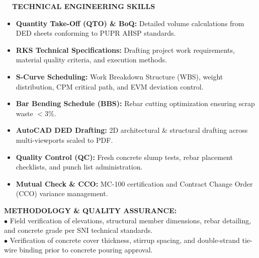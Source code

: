 \documentclass[10pt,a4paper,landscape]{article}
\begin{document}
\noindent
\begin{minipage}[t]{0.32\linewidth}
  \vspace{0pt}
  \begin{tcolorbox}[sharp corners, boxrule=0.8pt, colframe=pborder, colback=white, left=3mm, right=3mm, top=2.5mm, bottom=2.5mm, height=100mm]
    \colorbox{pred}{\fontsize{7pt}{8pt}\selectfont\bfseries\color{white}\ \ TECHNICAL ENGINEERING SKILLS\ \ }\\[1.5mm]

    {\fontsize{6.7pt}{8.4pt}\selectfont\color{psteel}
    \begin{itemize}[leftmargin=3mm, itemsep=0.6mm, topsep=0mm]
      \item \textbf{Quantity Take-Off (QTO) \& BoQ:} Detailed volume calculations from DED sheets conforming to PUPR AHSP standards.
      \item \textbf{RKS Technical Specifications:} Drafting project work requirements, material quality criteria, and execution methods.
      \item \textbf{S-Curve Scheduling:} Work Breakdown Structure (WBS), weight distribution, CPM critical path, and EVM deviation control.
      \item \textbf{Bar Bending Schedule (BBS):} Rebar cutting optimization ensuring scrap waste $< 3\%$.
      \item \textbf{AutoCAD DED Drafting:} 2D architectural \& structural drafting across multi-viewports scaled to PDF.
      \item \textbf{Quality Control (QC):} Fresh concrete slump tests, rebar placement checklists, and punch list administration.
      \item \textbf{Mutual Check \& CCO:} MC-100 certification and Contract Change Order (CCO) variance management.
    \end{itemize}
    }
  \end{tcolorbox}
  \vspace{2mm}

  \begin{tcolorbox}[sharp corners, boxrule=0.6pt, colframe=pnavy, colback=pbglight, left=2.5mm, right=2.5mm, top=2mm, bottom=2mm, height=52mm]
    {\fontsize{7pt}{8.5pt}\selectfont\bfseries\color{pnavy}METHODOLOGY \& QUALITY ASSURANCE:}\\[1.5mm]
    {\fontsize{6.5pt}{8.2pt}\selectfont\color{psteel}
    $\bullet$ Field verification of elevations, structural member dimensions, rebar detailing, and concrete grade per SNI technical standards.\\
    $\bullet$ Verification of concrete cover thickness, stirrup spacing, and double-strand tie-wire binding prior to concrete pouring approval.
    }
  \end{tcolorbox}
\end{minipage}%
\end{document}
